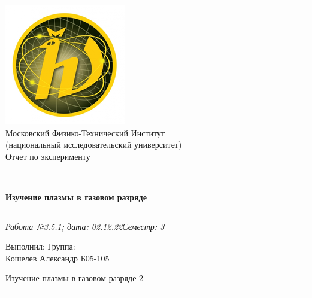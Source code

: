 \documentclass[12pt,a4paper]{scrartcl}
\begin{document}
	\begin{titlepage}
		
		\vspace*{\fill}
		
		\begin{center}
			\includegraphics[scale=0.8]{MIPT.png}
			\\[0.7cm]\Huge Московский Физико-Технический Институт\\(национальный исследовательский университет)
			\\[2cm]\LARGE Отчет по эксперименту
			\\[0.5cm]\noindent\rule{\textwidth}{1pt}
			\\\Huge\textbf{Изучение плазмы в газовом разряде}
			\\[-0.5cm]\noindent\rule{\textwidth}{1pt}
		\end{center}
		
		\begin{flushleft}
			\textit{Работа №3.5.1; дата: 02.12.22}\hfill\textit{Семестр: 3}
		\end{flushleft}
		
		\vspace*{\fill}
		
		\begin{flushleft}
			Выполнил: \hspace{\fill} Группа:
			\\Кошелев Александр \hspace{\fill} Б05-105
		\end{flushleft}
	\end{titlepage}
	
	
	\begin{flushleft}
		\footnotesize{Изучение плазмы в газовом разряде} \hspace{\fill} \footnotesize{2}
		\\[-0.3cm]\noindent\rule{\textwidth}{0.3pt}
	\end{flushleft}
	
\end{document}
